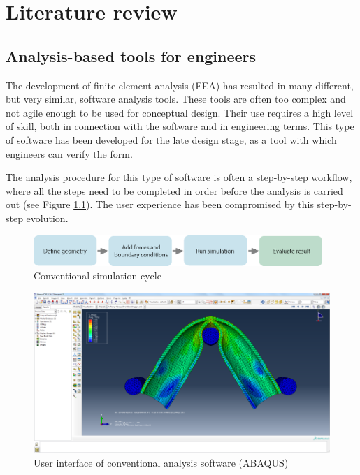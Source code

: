 \chapter{Literature review}
\label{ch:Literature review}
\section{Analysis-based tools for engineers}
The development of finite element analysis (FEA) has resulted in many different, but very similar, software analysis tools. These tools are often too complex and not agile enough to be used for conceptual design. Their use requires a high level of skill, both in connection with the software and in engineering terms. This type of software has been developed for the late design stage, as a tool with which engineers can verify the form.

 The analysis procedure for this type of software is often a step-by-step workflow, where all the steps need to be completed in order before the analysis is carried out (see Figure \ref{fig:conventional-cycle}). The user experience has been compromised by this step-by-step evolution.

\begin{figure}
  \includegraphics[width=310pt]{graphics/conventional-cycle.eps}
  \caption{Conventional simulation cycle}
  \label{fig:conventional-cycle}
\end{figure}

\begin{figure}
  \includegraphics[width=350pt]{graphics/abaqus.png}
  \caption{User interface of conventional analysis software (ABAQUS)}
  \label{fig:abaqus}
\end{figure}

